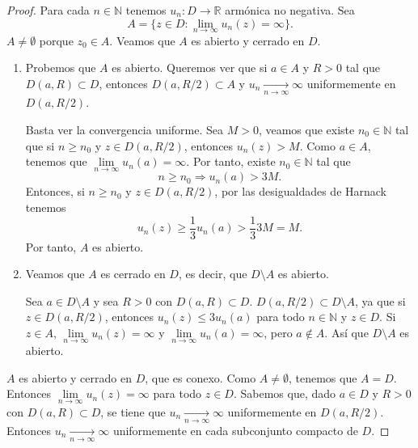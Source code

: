 \begin{proof}
    Para cada $n \in \mathbb{N}$ tenemos $u_n: D \to \mathbb{R}$ armónica no negativa.
    Sea
    $$A = \{z \in D : \lim\limits_{n \to \infty} u_n(z) = \infty\}.$$
    $A \neq \emptyset$ porque $z_0 \in A$.
    Veamos que $A$ es abierto y cerrado en $D$.

    \begin{enumerate}
        \item Probemos que $A$ es abierto.
              Queremos ver que si $a \in A$ y $R > 0$ tal que $D(a, R) \subset D$, entonces $D(a, R/2) \subset A$ y $u_n \xrightarrow[n \to \infty]{} \infty$ uniformemente en $D(a, R/2)$.

              Basta ver la convergencia uniforme.
              Sea $M > 0$, veamos que existe $n_0 \in \mathbb{N}$ tal que si $n \geq n_0$ y $z \in D(a, R/2)$, entonces $u_n(z) > M$.
              Como $a \in A$, tenemos que $\lim\limits_{n \to \infty} u_n(a) = \infty$.
              Por tanto, existe $n_0 \in \mathbb{N}$ tal que
              $$n \geq n_0 \Rightarrow u_n(a) > 3M.$$
              Entonces, si $n \geq n_0$ y $z \in D(a, R/2)$, por las desigualdades de Harnack tenemos
              $$u_n(z) \geq \frac{1}{3}u_n(a) > \frac{1}{3}3M = M.$$
              Por tanto, $A$ es abierto.

        \item Veamos que $A$ es cerrado en $D$, es decir, que $D \setminus A$ es abierto.

              Sea $a \in D \setminus A$ y sea $R > 0$ con $D(a, R) \subset D$.
              $D(a, R/2) \subset D \setminus A$, ya que si $z \in D(a, R/2)$, entonces $u_n(z) \leq 3u_n(a)$ para todo $n \in \mathbb{N}$ y $z \in D$.
              Si $z \in A$, $\lim\limits_{n \to \infty} u_n(z) = \infty$ y $\lim\limits_{n \to \infty} u_n(a) = \infty$, pero $a \notin A$.
              Así que $D \setminus A$ es abierto.
    \end{enumerate}

    $A$ es abierto y cerrado en $D$, que es conexo.
    Como $A \neq \emptyset$, tenemos que $A = D$.
    Entonces $\lim\limits_{n \to \infty} u_n(z) = \infty$ para todo $z \in D$.
    Sabemos que, dado $a \in D$ y $R > 0$ con $D(a, R) \subset D$, se tiene que $u_n \xrightarrow[n \to \infty]{} \infty$ uniformemente en $D(a, R/2)$.
    Entonces $u_n \xrightarrow[n \to \infty]{} \infty$ uniformemente en cada subconjunto compacto de $D$.
\end{proof}

